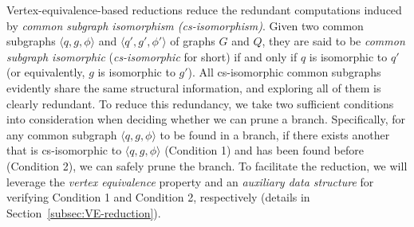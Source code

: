 Vertex-equivalence-based reductions reduce the redundant computations induced by \emph{common subgraph isomorphism (cs-isomorphism)}. 
%
{\YuiR
{\chengD Given} two common subgraphs $\langle q,g,\phi \rangle$ and $\langle q',g',\phi' \rangle$ of graphs $G$ and $Q$, they are said to be \textit{common subgraph isomorphic} (\textit{cs-isomorphic} for short) if and only if $q$ is isomorphic to $q'$ (or equivalently, $g$ is isomorphic to $g'$). All cs-isomorphic common subgraphs evidently share the same structural information, and exploring all of them is clearly redundant.
%
{\kaixin To reduce this redundancy, we take two sufficient conditions into consideration {\chengD when deciding whether we can prune a branch}. Specifically, } for {\chengC any} common subgraph $\langle q,g,\phi \rangle$ to be found in a branch, if there exists another that is cs-isomorphic to $\langle q,g,\phi \rangle$ (Condition 1) and has been found before (Condition 2), we can safely {\chengC prune the branch.}
To facilitate the reduction, 
we will leverage the \emph{vertex equivalence} property \cite{nguyen2019applications} and an \emph{auxiliary data structure} for verifying Condition 1 and Condition 2, respectively {\chengC (details in Section~\ref{subsec:VE-reduction})}.}


